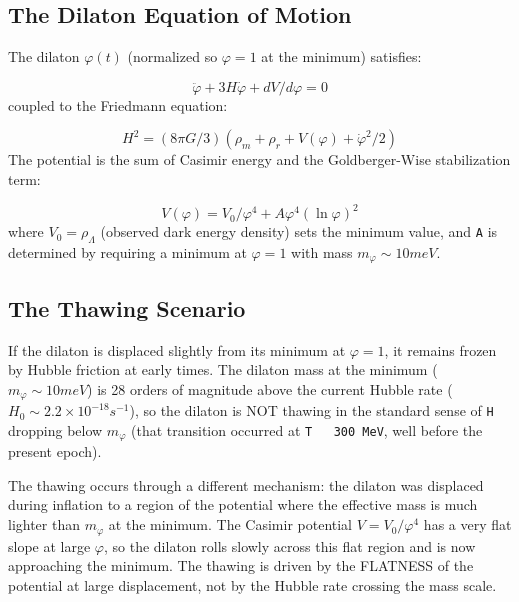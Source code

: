 \documentclass[aps,prd,preprint,superscriptaddress,longbibliography]{revtex4-2}
\begin{document}
\subsection{The Dilaton Equation of Motion}

The dilaton $\varphi(t)$ (normalized so $\varphi = 1$ at the minimum) satisfies:


\begin{equation}
    \ddot{\varphi} + 3H\dot{\varphi} + dV/d\varphi = 0
\end{equation}
coupled to the Friedmann equation:


\begin{equation}
    H^{2} = (8\pi G/3)(\rho_m + \rho_r + V(\varphi) + \dot{\varphi}^{2}/2)
\end{equation}
The potential is the sum of Casimir energy and the Goldberger-Wise stabilization term:


\begin{equation}
    V(\varphi) = V_{0}/\varphi^{4} + A \varphi^{4} (\ln \varphi)^{2}
\end{equation}
where $V_{0} = \rho_\Lambda$ (observed dark energy density) sets the minimum value, and \texttt{A} is determined by requiring a minimum at $\varphi = 1$ with mass $m_\varphi \sim  10 meV$.



\subsection{The Thawing Scenario}

If the dilaton is displaced slightly from its minimum at $\varphi = 1$, it remains frozen by Hubble friction at early times. The dilaton mass at the minimum ($m_\varphi \sim  10 meV$) is 28 orders of magnitude above the current Hubble rate ($H_{0} \sim  2.2 \times 10^{-18} s^{-1}$), so the dilaton is NOT thawing in the standard sense of \texttt{H} dropping below $m_\varphi$ (that transition occurred at \texttt{T ~ 300 MeV}, well before the present epoch).

The thawing occurs through a different mechanism: the dilaton was displaced during inflation to a region of the potential where the effective mass is much lighter than $m_\varphi$ at the minimum. The Casimir potential $V = V_{0}/\varphi^{4}$ has a very flat slope at large $\varphi$, so the dilaton rolls slowly across this flat region and is now approaching the minimum. The thawing is driven by the FLATNESS of the potential at large displacement, not by the Hubble rate crossing the mass scale.
\end{document}

